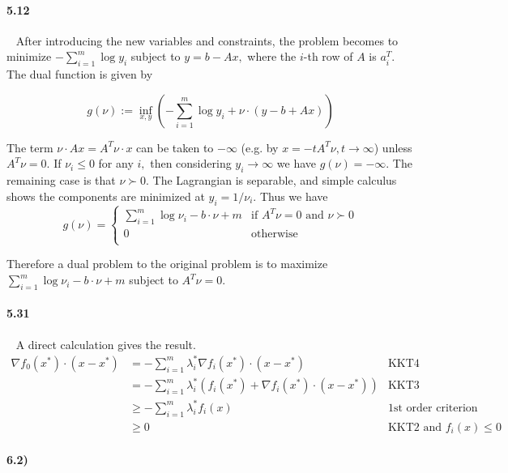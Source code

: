 \documentclass[a4paper,12pt]{article}
\begin{document}
\paragraph*{5.12}
\
\newline
After introducing the new variables and constraints, the problem becomes to minimize $-\displaystyle\sum_{i=1}^m \log y_i$ subject to $ y = b - Ax,$ where the $i$-th row of $A$ is $a_i^T.$ The dual function is given by 

$$ g(\nu) := \inf_{x,y} \left( -\sum_{i=1}^m \log y_i + \nu \cdot (y-b+Ax) \right)$$

The term $\nu\cdot Ax = A^T\nu \cdot x$ can be taken to $-\infty$ (e.g. by $x= -t A^T\nu, t\to\infty$) unless $A^T\nu = 0.$ If $\nu_i \leq 0$ for any $i,$ then considering $y_i \to \infty$ we have $g(\nu) = -\infty.$ The remaining case is that $\nu \succ 0.$ The Lagrangian is separable, and simple calculus shows the components are minimized at $y_i = 1/\nu_i.$ Thus we have
\[
  g(\nu) =
  \begin{cases}
                                   \sum_{i=1}^m \log \nu_i - b\cdot \nu + m & \text{if $A^T\nu=0$ and $\nu \succ 0$} \\
                                  0 & \text{otherwise} \\
  \end{cases}
\]

Therefore a dual problem to the original problem is to maximize $\sum_{i=1}^m \log \nu_i - b\cdot \nu + m$ subject to $A^T\nu =0.$

\paragraph*{5.31}
\
\newline
A direct calculation gives the result.
\begin{align*}
 \nabla f_0(x^*)\cdot (x-x^*) &= - \sum_{i=1}^m \lambda^*_i \nabla f_i(x^*)\cdot (x-x^*) &\text{KKT4} \\
 &= - \sum_{i=1}^m \lambda^*_i \left(f_i(x^*)+\nabla f_i(x^*)\cdot (x-x^*)\right) &\text{KKT3} \\
 &\geq - \sum_{i=1}^m \lambda_i^* f_i(x) & \text{1st order criterion for convexity}\\
 &\geq 0 &\text{KKT2 and $f_i(x)\leq 0$}
\end{align*}



\paragraph{6.2)}
\
\newline
\end{document}
